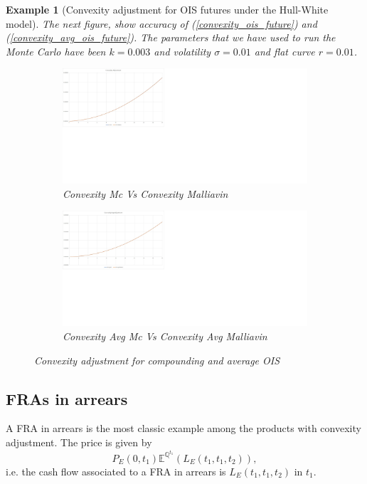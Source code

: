 \documentclass[a4paper,10pt]{article}
\newtheorem{example}[theorem]{Example}
\newcommand{\1}{\mathbf{1}}
\begin{document}
\begin{example}[Convexity adjustment for OIS futures under the Hull-White model]
The next figure, show accuracy of (\ref{convexity_ois_future}) and (\ref{convexity_avg_ois_future}). The parameters that we have used to run the Monte Carlo have been $k=0.003$ and volatility $\sigma=0.01$ and flat curve $r=0.01$. 
\begin{figure}[H]
\begin{subfigure}{.5\textwidth}
  \centering
  \includegraphics[scale=0.2]{Figures/convexity_ois.jpg}
		\caption{Convexity Mc Vs Convexity Malliavin}
\end{subfigure}
\begin{subfigure}{.5\textwidth}
  \centering
  \includegraphics[scale=0.2]{Figures/convexity_avg_ois.jpg}
		\caption{Convexity Avg Mc Vs Convexity Avg Malliavin}
\end{subfigure}
\caption{Convexity adjustment for compounding and average OIS}
\end{figure} 
\end{example}



\subsection{FRAs in arrears}
A FRA in arrears is the most classic example among the products with convexity adjustment. The price is given by 
\begin{equation}\label{FRAinArrear}
P_{E}(0,t_1)\mathbb{E}^{\mathbb{Q}^{t_1}}\left(L_{E}(t_1,t_1,t_2)\right),
\end{equation}
i.e. the cash flow associated to a FRA in arrears is $L_{E}(t_1,t_1,t_2)$ in $t_1$.
\end{document}
